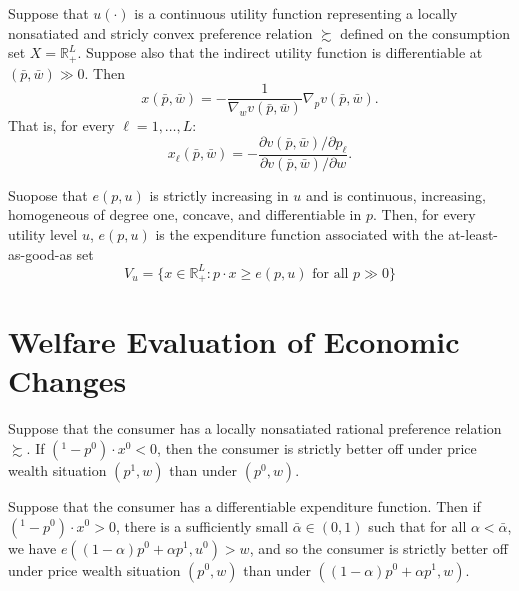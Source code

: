 \begin{prop}
    Suppose that $u(\cdot)$ is a continuous utility function representing a locally nonsatiated and stricly convex preference relation $\succsim$ defined on the consumption set $X = \mathbb{R}^L_+$. Suppose also that the indirect utility function is differentiable at $(\bar{p}, \bar{w}) \gg 0$. Then
    \begin{equation*}
        x(\bar{p}, \bar{w}) = - \frac{1}{\nabla_w v(\bar{p}, \bar{w})} \nabla_p v(\bar{p}, \bar{w}).
    \end{equation*}
    That is, for every $\ell = 1, \dots, L$:
    \begin{equation*}
        x_\ell (\bar{p}, \bar{w}) = - \frac{\partial v(\bar{p}, \bar{w}) / \partial p_\ell}{\partial v(\bar{p}, \bar{w}) / \partial w}.
    \end{equation*}
\end{prop}

\begin{prop}
    Suopose that $e(p, u)$ is strictly increasing in $u$ and is continuous, increasing, homogeneous of degree one, concave, and differentiable in $p$. Then, for every utility level $u$, $e(p, u)$ is the expenditure function associated with the at-least-as-good-as set
    \begin{equation*}
        V_u = \{x \in \mathbb{R}^L_+ : p \cdot x \geq e(p, u) \text{ for all } p \gg 0\}
    \end{equation*}
\end{prop}


\section{Welfare Evaluation of Economic Changes}

\begin{prop}
    Suppose that the consumer has a locally nonsatiated rational preference relation $\succsim$. If $(^1 - p^0) \cdot x^0 < 0$, then the consumer is strictly better off under price wealth situation $(p^1, w)$ than under $(p^0, w)$.
\end{prop}

\begin{prop}
    Suppose that the consumer has a differentiable expenditure function. Then if $(^1 - p^0) \cdot x^0 > 0$, there is a sufficiently small $\bar{\alpha} \in (0, 1)$ such that for all $\alpha < \bar{\alpha}$, we have $e((1 - \alpha) p^0 + \alpha p^1, u^0) > w$, and so the consumer is strictly better off under price wealth situation $(p^0, w)$ than under $((1 - \alpha) p^0 + \alpha p^1, w)$.
\end{prop}

